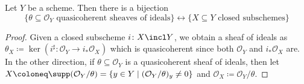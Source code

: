 \documentclass[wip, algebra]{bsteffan-lecturenotes}
\newcommand{\cO}{\mathcal{O}}
\begin{document}
\begin{proposition}
	Let $Y$ be a scheme.
	Then there is a bijection
	\begin{equation*}
		\{\theta \subseteq \cO_Y \text{ quasicoherent sheaves of ideals}\} \leftrightarrow \{X \subseteq Y \text{ closed subschemes}\}
	\end{equation*}
\end{proposition}
\begin{proof}
	Given a closed subscheme $i\colon X \incl Y$, we obtain a sheaf of ideals as $\theta_X \coloneq \ker(i^\sharp\colon \cO_Y \to i_* \cO_X)$ which is quasicoherent since both $\cO_Y$ and $i_* \cO_X$ are.
	In the other direction, if $\theta \subseteq \cO_Y$ is a quasicoherent sheaf of ideals, then let $X \coloneq \supp(\cO_Y / \theta) = \{y \in Y \mid (\cO_Y / \theta)_y \neq 0\}$ and $\cO_X \coloneq \cO_Y / \theta$.
\end{proof}
\end{document}
